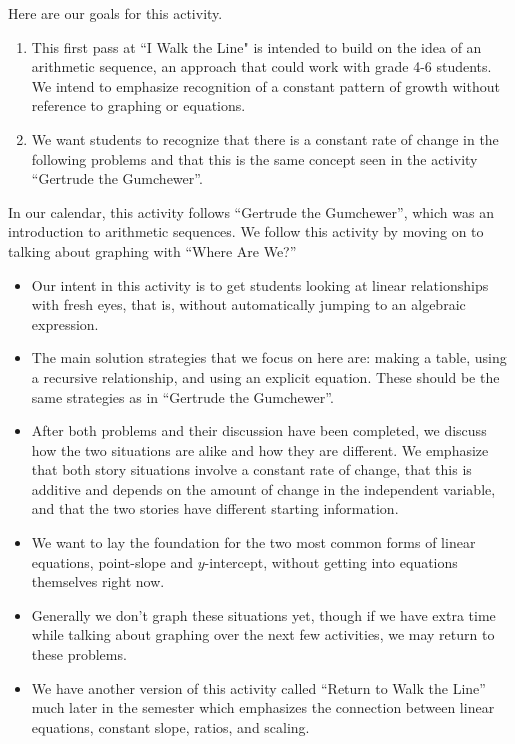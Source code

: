 \documentclass{ximera}
\begin{document}
\begin{instructorNotes}
Here are our goals for this activity.
\begin{enumerate}
\item  This first pass at ``I Walk the Line" is intended to build on the idea of an arithmetic sequence, an approach that could work with grade 4-6 students.  We intend to emphasize  recognition of a constant pattern of growth without reference to graphing or equations.
\item We want students to recognize that there is a constant rate of change in the following problems and that this is the same concept seen in the activity ``Gertrude the Gumchewer''.
\end{enumerate}

In our calendar, this activity follows ``Gertrude the Gumchewer'', which was an introduction to arithmetic sequences.  We follow this activity by moving on to talking about graphing with ``Where Are We?''

\begin{itemize}
\item Our intent in this activity is to get students looking at linear relationships with fresh eyes, that is, without automatically jumping to an algebraic expression. 
\item The main solution strategies that we focus on here are: making a table, using a recursive relationship, and using an explicit equation.  These should be the same strategies as in ``Gertrude the Gumchewer''.
\item  After both problems and their discussion have been completed, we discuss how the two situations are alike and how they are different.  We emphasize that both story situations involve a constant rate of change, that this is additive and depends on the amount of change in the independent variable, and that the two stories have different starting information.  
\item  We want to lay the foundation for the two most common forms of linear equations, point-slope and $y$-intercept, without getting into equations themselves right now. 
\item Generally we don't graph these situations yet, though if we have extra time while talking about graphing over the next few activities, we may return to these problems.
\item We have another version of this activity called ``Return to Walk the Line'' much later in the semester which emphasizes the connection between linear equations, constant slope, ratios, and scaling.
\end{itemize}

\end{instructorNotes}
\end{document}
